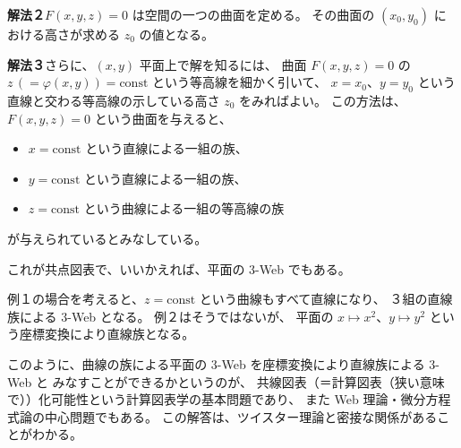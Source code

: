 \documentclass[uplatex,dvipdfmx]{jlreq}
\begin{document}
\medskip

\noindent\textbf{解法２}\quad $F(x,y,z) = 0$ は空間の一つの曲面を定める。
その曲面の $(x_0, y_0)$ における高さが求める $z_0$ の値となる。

\medskip

\noindent\textbf{解法３}\quad さらに、$(x,y)$ 平面上で解を知るには、
曲面 $F(x,y,z) = 0$ の $z\,(= \varphi(x,y)) = \mathrm{const}$ という等高線を細かく引いて、
$x = x_0$、$y = y_0$ という直線と交わる等高線の示している高さ $z_0$ をみればよい。
この方法は、$F(x,y,z) = 0$ という曲面を与えると、
\begin{itemize}
  \setlength{\itemsep}{2pt}
  \item $x = \mathrm{const}$ という直線による一組の族、
  \item $y = \mathrm{const}$ という直線による一組の族、
  \item $z = \mathrm{const}$ という曲線による一組の等高線の族
\end{itemize}
が与えられているとみなしている。

これが共点図表で、いいかえれば、平面の $3$-Web でもある。

\bigskip

例１の場合を考えると、$z = \mathrm{const}$ という曲線もすべて直線になり、
３組の直線族による $3$-Web となる。
例２はそうではないが、
平面の $x \mapsto x^2$、$y \mapsto y^2$ という座標変換により直線族となる。

\medskip

このように、曲線の族による平面の $3$-Web を座標変換により直線族による $3$-Web と
みなすことができるかというのが、
共線図表（＝計算図表（狭い意味で））化可能性という計算図表学の基本問題であり、
また Web 理論・微分方程式論の中心問題でもある。
この解答は、ツイスター理論と密接な関係があることがわかる。
\end{document}
